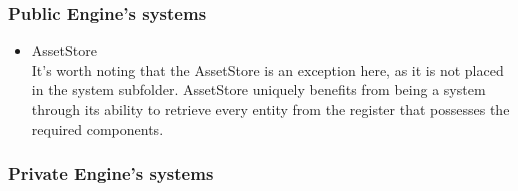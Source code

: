 \subsubsection{Public Engine's systems}
\begin{itemize}
    \item AssetStore\\
    It's worth noting that the AssetStore is an exception here, as it is not placed in the system subfolder. AssetStore uniquely benefits from being a system through its ability to retrieve every entity from the register that possesses the required components.
\end{itemize}

\subsubsection{Private Engine's systems}
